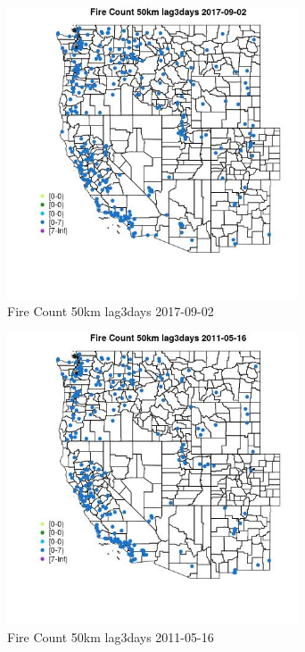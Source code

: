 \begin{figure} 
\centering  
\includegraphics[width=0.77\textwidth]{Code_Outputs/Report_ML_input_PM25_Step4_part_e_de_duplicated_aves_compiled_2019-05-21wNAs_MapObsFire_Count_50km_lag3days2017-09-02.jpg} 
\caption{\label{fig:Report_ML_input_PM25_Step4_part_e_de_duplicated_aves_compiled_2019-05-21wNAsMapObsFire_Count_50km_lag3days2017-09-02}Fire Count 50km lag3days 2017-09-02} 
\end{figure} 
 

\begin{figure} 
\centering  
\includegraphics[width=0.77\textwidth]{Code_Outputs/Report_ML_input_PM25_Step4_part_e_de_duplicated_aves_compiled_2019-05-21wNAs_MapObsFire_Count_50km_lag3days2011-05-16.jpg} 
\caption{\label{fig:Report_ML_input_PM25_Step4_part_e_de_duplicated_aves_compiled_2019-05-21wNAsMapObsFire_Count_50km_lag3days2011-05-16}Fire Count 50km lag3days 2011-05-16} 
\end{figure} 
 


